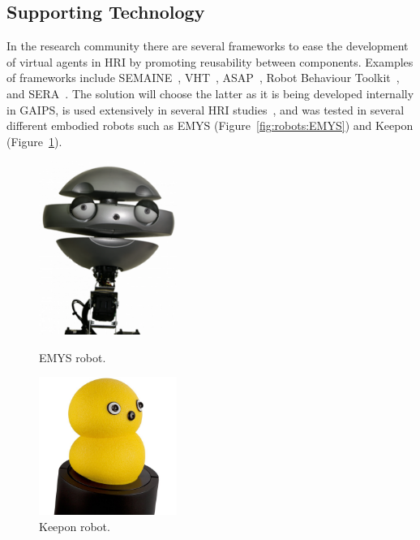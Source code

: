 \subsection{Supporting Technology}
\label{sub:sec:SERAFramework}

In the research community there are several frameworks to ease the development of virtual agents in \ac{HRI} by promoting reusability between components. Examples of frameworks include SEMAINE~\cite{Schroder2010a}, \acl{VHT}~\cite{Hartholt2013}, \acl{ASAP}~\cite{Kopp2013}, Robot Behaviour Toolkit~\cite{Huang2012}, and \ac{SERA}~\cite{Tullio2015}. The solution will choose the latter as it is being developed internally in \ac{GAIPS}, is used extensively in several \ac{HRI} studies~\cite{Tullio2015}, and was tested in several different embodied robots such as \ac{EMYS} (Figure~\ref{fig:robots:EMYS}) and Keepon (Figure~\ref{fig:robots:Keepon}).

\begin{figure}[ht]
	\begin{minipage}[b]{.4\textwidth}
		\centering
		\includegraphics[width=0.4\textwidth]{images/emys.png}
		\caption{EMYS robot.}
		\label{fig:robots:EMYS}
	\end{minipage}
	\hfill
	\begin{minipage}[b]{.4\textwidth}
		\centering
		\includegraphics[width=0.4\textwidth]{images/Keepon.jpg}
		\caption{Keepon robot.}
		\label{fig:robots:Keepon}
	\end{minipage}
\end{figure}

